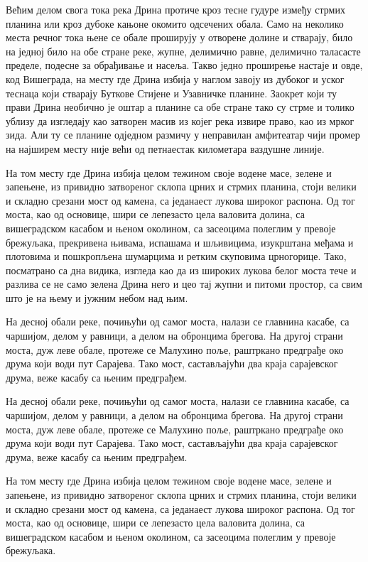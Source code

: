 \documentclass{UUThesisTemplate}
\begin{document}
\begin{serbian}
{\par Већим делом свога тока река Дрина протиче кроз тесне гудуре између стрмих планина или кроз дубоке кањоне окомито одсечених обала. Само на неколико места речног тока њене се обале проширују у отворене долине и стварају, било на једној било на обе стране реке, жупне, делимично равне, делимично таласасте пределе, подесне за обрађивање и насеља. Такво једно проширење настаје и овде, код Вишеграда, на месту где Дрина избија у наглом завоју из дубоког и уског теснаца који стварају Буткове Стијене и Узавничке планине. Заокрет који ту прави Дрина необично је оштар а планине са обе стране тако су стрме и толико ублизу да изгледају као затворен масив из којег река извире право, као из мрког зида. Али ту се планине одједном размичу у неправилан амфитеатар чији промер на најширем месту није већи од петнаестак километара ваздушне линије.
\par На том месту где Дрина избија целом тежином своје водене масе, зелене и запењене, из привидно затвореног склопа црних и стрмих планина, стоји велики и складно срезани мост од камена, са једанаест лукова широког распона. Од тог моста, као од основице, шири се лепезасто цела валовита долина, са вишеградском касабом и њеном околином, са засеоцима полеглим у превоје брежуљака, прекривена њивама, испашама и шљивицима, изукрштана међама и плотовима и пошкропљена шумарцима и ретким скуповима црногорице. Тако, посматрано са дна видика, изгледа као да из широких лукова белог моста тече и разлива се не само зелена Дрина него и цео тај жупни и питоми простор, са свим што је на њему и јужним небом над њим.
\par На десној обали реке, почињући од самог моста, налази се главнина касабе, са чаршијом, делом у равници, а делом на обронцима брегова. На другој страни моста, дуж леве обале, протеже се Малухино поље, раштркано предграђе око друма који води пут Сарајева. Тако мост, састављајући два краја сарајевског друма, веже касабу са њеним предграђем.
\par На десној обали реке, почињући од самог моста, налази се главнина касабе, са чаршијом, делом у равници, а делом на обронцима брегова. На другој страни моста, дуж леве обале, протеже се Малухино поље, раштркано предграђе око друма који води пут Сарајева. Тако мост, састављајући два краја сарајевског друма, веже касабу са њеним предграђем.
\par На том месту где Дрина избија целом тежином своје водене масе, зелене и запењене, из привидно затвореног склопа црних и стрмих планина, стоји велики и складно срезани мост од камена, са једанаест лукова широког распона. Од тог моста, као од основице, шири се лепезасто цела валовита долина, са вишеградском касабом и њеном околином, са засеоцима полеглим у превоје брежуљака.
}
\end{serbian}
\end{document}
